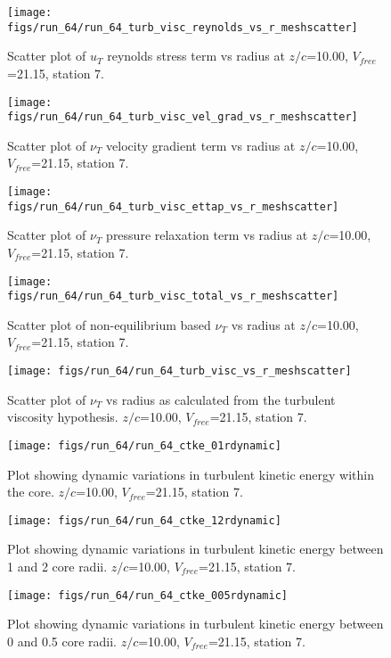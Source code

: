 \begin{figure}[H]
\centering
\texttt{[image: figs/run\_64/run\_64\_turb\_visc\_reynolds\_vs\_r\_meshscatter]}
\caption{Scatter plot of $
u_T$ reynolds stress term vs radius at $z/c$=10.00, $V_{free}$=21.15, station 7.}
\end{figure}


\begin{figure}[H]
\centering
\texttt{[image: figs/run\_64/run\_64\_turb\_visc\_vel\_grad\_vs\_r\_meshscatter]}
\caption{Scatter plot of $\nu_T$ velocity gradient term vs radius at $z/c$=10.00, $V_{free}$=21.15, station 7.}
\end{figure}


\begin{figure}[H]
\centering
\texttt{[image: figs/run\_64/run\_64\_turb\_visc\_ettap\_vs\_r\_meshscatter]}
\caption{Scatter plot of $\nu_T$ pressure relaxation term vs radius at $z/c$=10.00, $V_{free}$=21.15, station 7.}
\end{figure}


\begin{figure}[H]
\centering
\texttt{[image: figs/run\_64/run\_64\_turb\_visc\_total\_vs\_r\_meshscatter]}
\caption{Scatter plot of non-equilibrium based $\nu_T$ vs radius at $z/c$=10.00, $V_{free}$=21.15, station 7.}
\end{figure}


\begin{figure}[H]
\centering
\texttt{[image: figs/run\_64/run\_64\_turb\_visc\_vs\_r\_meshscatter]}
\caption{Scatter plot of $\nu_T$ vs radius as calculated from the turbulent viscosity hypothesis. $z/c$=10.00, $V_{free}$=21.15, station 7.}
\end{figure}


\begin{figure}[H]
\centering
\texttt{[image: figs/run\_64/run\_64\_ctke\_01rdynamic]}
\caption{Plot showing dynamic variations in turbulent kinetic energy within the core. $z/c$=10.00, $V_{free}$=21.15, station 7.}
\end{figure}


\begin{figure}[H]
\centering
\texttt{[image: figs/run\_64/run\_64\_ctke\_12rdynamic]}
\caption{Plot showing dynamic variations in turbulent kinetic energy between 1 and 2 core radii. $z/c$=10.00, $V_{free}$=21.15, station 7.}
\end{figure}


\begin{figure}[H]
\centering
\texttt{[image: figs/run\_64/run\_64\_ctke\_005rdynamic]}
\caption{Plot showing dynamic variations in turbulent kinetic energy between 0 and 0.5 core radii. $z/c$=10.00, $V_{free}$=21.15, station 7.}
\end{figure}



